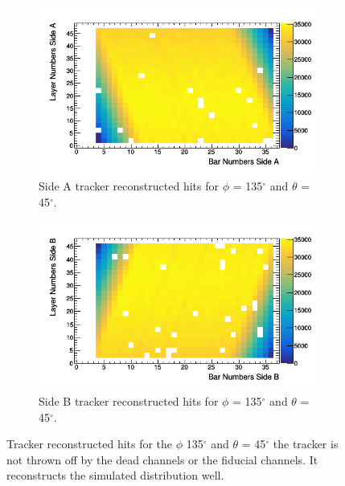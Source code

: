 \begin{figure}[htbp]
\centering
\begin{subfigure}{.5\textwidth}
  \centering
  \includegraphics[width=\linewidth]{Chapter5/Figs/cosmicTrackerUncertainties/trackedAWithDead.png}
  \captionsetup{width=.9\linewidth}
  \caption{Side A tracker reconstructed hits for $\phi$ = 135$^\circ$ and $\theta$ = 45$^\circ$.}
  \label{subFig:trackedAWithDead}
\end{subfigure}%
\begin{subfigure}{.5\textwidth}
  \centering
\includegraphics[width=\linewidth]{Chapter5/Figs/cosmicTrackerUncertainties/trackedBWithDead.png}
  \captionsetup{width=.9\linewidth}
  \caption{Side B tracker reconstructed hits for $\phi$ = 135$^\circ$ and $\theta$ = 45$^\circ$.}
  \label{subFig:trackedBWithDead}
\end{subfigure}
\caption{Tracker reconstructed hits for the $\phi$ 135$^\circ$ and $\theta$ = 45$^\circ$ the tracker is not thrown off by the dead channels or the fiducial channels. It reconstructs the simulated distribution well.}
\label{fig:trackedABWithDead}
\end{figure}

